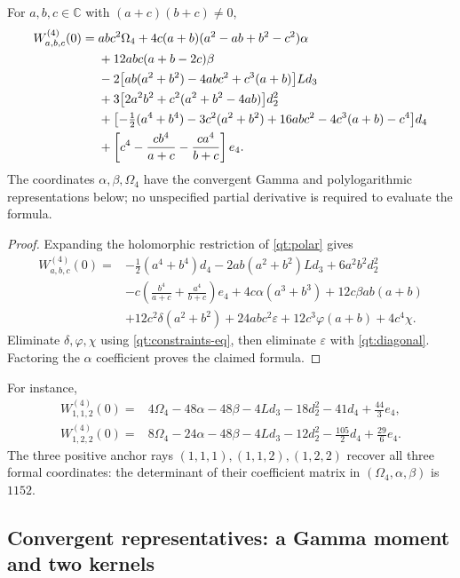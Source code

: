 \begin{theorem}\label{qt:main}
For $a,b,c\in\mathbb C$ with $(a+c)(b+c)\ne0$,
\begin{align}\label{qt:all-rays}
 W_{a,b,c}^{(4)}(0)={}&abc^2\Omega_4
 +4c(a+b)(a^2-ab+b^2-c^2)\alpha\notag\\
 &+12abc(a+b-2c)\beta\notag\\
 &-2\bigl[ab(a^2+b^2)-4abc^2+c^3(a+b)\bigr]Ld_3\notag\\
 &+3\bigl[2a^2b^2+c^2(a^2+b^2-4ab)\bigr]d_2^2\notag\\
 &+\bigl[-\tfrac12(a^4+b^4)-3c^2(a^2+b^2)
              +16abc^2-4c^3(a+b)-c^4\bigr]d_4\notag\\
 &+\left[c^4-\frac{cb^4}{a+c}-\frac{ca^4}{b+c}\right]e_4.
\end{align}
The coordinates $\alpha,\beta,\Omega_4$ have the convergent
Gamma and polylogarithmic representations below; no unspecified partial
derivative is required to evaluate the formula.
\end{theorem}
\begin{proof}
Expanding the holomorphic restriction of \eqref{qt:polar} gives
\begin{align*}
 W_{a,b,c}^{(4)}(0)={}&-\tfrac12(a^4+b^4)d_4
 -2ab(a^2+b^2)Ld_3+6a^2b^2d_2^2\\
 &-c\left(\frac{b^4}{a+c}+\frac{a^4}{b+c}\right)e_4
 +4c\alpha(a^3+b^3)+12c\beta ab(a+b)\\
 &+12c^2\delta(a^2+b^2)+24abc^2\varepsilon
 +12c^3\varphi(a+b)+4c^4\chi.
\end{align*}
Eliminate $\delta,\varphi,\chi$ using \eqref{qt:constraints-eq},
then eliminate $\varepsilon$ with \eqref{qt:diagonal}. Factoring the
$\alpha$ coefficient proves the claimed formula.
\end{proof}

For instance,
\begin{align}
 W_{1,1,2}^{(4)}(0)={}&4\Omega_4-48\alpha-48\beta-4Ld_3
                      -18d_2^2-41d_4+\tfrac{44}{3}e_4,
 \label{qt:112}\\
 W_{1,2,2}^{(4)}(0)={}&8\Omega_4-24\alpha-48\beta-4Ld_3
                      -12d_2^2-\tfrac{105}{2}d_4+\tfrac{29}{6}e_4.
 \label{qt:122}
\end{align}
The three positive anchor rays $(1,1,1),(1,1,2),(1,2,2)$ recover
all three formal coordinates: the determinant of their coefficient
matrix in $(\Omega_4,\alpha,\beta)$ is $1152$.

\subsection{Convergent representatives: a Gamma moment and two kernels}

